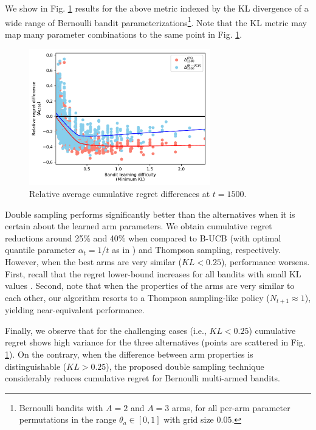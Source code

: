 \documentclass{article}
\newcommand{\ie}{i.e., }
\begin{document}
We show in Fig. \ref{fig:bernoulli_relative_cumregret_kl} results for the above metric indexed by the KL divergence of a wide range of Bernoulli bandit parameterizations\footnote{Bernoulli bandits with $A=2$ and $A=3$ arms, for all per-arm parameter permutations in the range $\theta_a\in[0,1]$ with grid size $0.05$.}. Note that the KL metric may map many parameter combinations to the same point in Fig. \ref{fig:bernoulli_relative_cumregret_kl}.

\begin{figure}[!h]
	\centering
	\includegraphics[width=0.7\textwidth]{./figs/bernoulli/min_KL_relDiff_Nmax1000_t1499_09.pdf}
	\caption{Relative average cumulative regret differences at $t=1500$.}
	\label{fig:bernoulli_relative_cumregret_kl}
\end{figure}

Double sampling performs significantly better than the alternatives when it is certain about the learned arm parameters. We obtain cumulative regret reductions around 25\% and 40\% when compared to B-UCB (with optimal quantile parameter $\alpha_t=1/t$ as in \cite{ip-Kaufmann2012}) and Thompson sampling, respectively. However, when the best arms are very similar ($KL<0.25$), performance worsens. First, recall that the regret lower-bound increases for all bandits with small KL values \cite{j-Lai1985}. Second, note that when the properties of the arms are very similar to each other, our algorithm resorts to a Thompson sampling-like policy ($N_{t+1}\approx1$), yielding near-equivalent performance.

Finally, we observe that for the challenging cases (\ie $KL<0.25$) cumulative regret shows high variance for the three alternatives (points are scattered in Fig. \ref{fig:bernoulli_relative_cumregret_kl}). On the contrary, when the difference between arm properties is distinguishable ($KL>0.25$), the proposed double sampling technique considerably reduces cumulative regret for Bernoulli multi-armed bandits.
\end{document}
